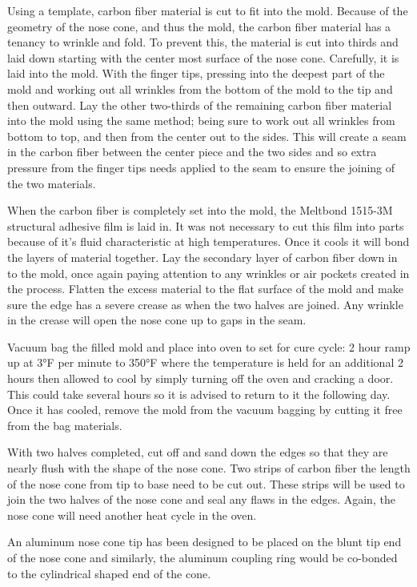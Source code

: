 \documentclass{aiaa-tc}%
\begin{document}
Using a template, carbon fiber material is cut to fit into the mold. Because of the geometry of the nose cone, and thus the mold, the carbon fiber material has a tenancy to wrinkle and fold. To prevent this, the material is cut into thirds and laid down starting with the center most surface of the nose cone. Carefully, it is laid into the mold. With the finger tips, pressing into the deepest part of the mold and working out all wrinkles from the bottom of the mold to the tip and then outward. Lay the other two-thirds of the remaining carbon fiber material into the mold using the same method; being sure to work out all wrinkles from bottom to top, and then from the center out to the sides. This will create a seam in the carbon fiber between the center piece and the two sides and so extra pressure from the finger tips needs applied to the seam to ensure the joining of the two materials.

When the carbon fiber is completely set into the mold, the Meltbond 1515-3M structural adhesive film is laid in. It was not necessary to cut this film into parts because of it's fluid characteristic at high temperatures. Once it cools it will bond the layers of material together. Lay the secondary layer of carbon fiber down in to the mold, once again paying attention to any wrinkles or air pockets created in the process. Flatten the excess material to the flat surface of the mold and make sure the edge has a severe crease as when the two halves are joined. Any wrinkle in the crease will open the nose cone up to gaps in the seam.

Vacuum bag the filled mold and place into oven to set for cure cycle: 2 hour ramp up at 3°F per minute to 350°F where the temperature is held for an additional 2 hours then allowed to cool by simply turning off the oven and cracking a door. This could take several hours so it is advised to return to it the following day. Once it has cooled, remove the mold from the vacuum bagging by cutting it free from the bag materials. 

With two halves completed, cut off and sand down the edges so that they are nearly flush with the shape of the nose cone. Two strips of carbon fiber the length of the nose cone from tip to base need to be cut out. These strips will be used to join the two halves of the nose cone and seal any flaws in the edges. Again, the nose cone will need another heat cycle in the oven. 

An aluminum nose cone tip has been designed to be placed on the blunt tip end of the nose cone and similarly, the aluminum coupling ring would be co-bonded to the cylindrical shaped end of the cone. 
\end{document}
